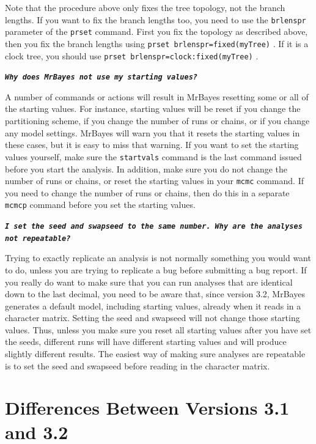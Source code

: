 \documentclass[12pt]{book}
\newcommand{\ttt}[1]{\texttt{#1} }
\newcommand{\tb}[1]{\texttt{\textbf{#1}} }
\begin{document}
Note that the procedure above only fixes the tree topology, not the branch lengths. If you want to
fix the branch lengths too, you need to use the \texttt{brlenspr} parameter of the \texttt{prset}
command.  First you fix the topology as described above, then you fix the branch lengths using
\ttt{prset brlenspr=fixed(myTree)}. If it is a clock tree, you should use \ttt{prset
brlenspr=clock:fixed(myTree)}.

\tb{\it{Why does MrBayes not use my starting values?}}

A number of commands or actions will result in MrBayes resetting some or all of the starting
values. For instance, starting values will be reset if you change the partitioning scheme, if you
change the number of runs or chains, or if you change any model settings. MrBayes will warn you
that it resets the starting values in these cases, but it is easy to miss that warning. If you want
to set the starting values yourself, make sure the \ttt{startvals} command is the last command
issued before you start the analysis. In addition, make sure you do not change the number of runs
or chains, or reset the starting values in your \texttt{mcmc} command. If you need to change the
number of runs or chains, then do this in a separate \ttt{mcmcp} command before you set the
starting values.

\tb{\it{I set the seed and swapseed to the same number. Why are the analyses not repeatable?}}

Trying to exactly replicate an analysis is not normally something you would want to do, unless you
are trying to replicate a bug before submitting a bug report. If you really do want to make sure
that you can run analyses that are identical down to the last decimal, you need to be aware that,
since version 3.2, MrBayes generates a default model, including starting values, already when it
reads in a character matrix. Setting the seed and swapseed will not change those starting values.
Thus, unless you make sure you reset all starting values after you have set the seeds, different
runs will have different starting values and will produce slightly different results. The easiest
way of making sure analyses are repeatable is to set the seed and swapseed before reading in the
character matrix.

\section{Differences Between Versions 3.1 and 3.2}
\end{document}
